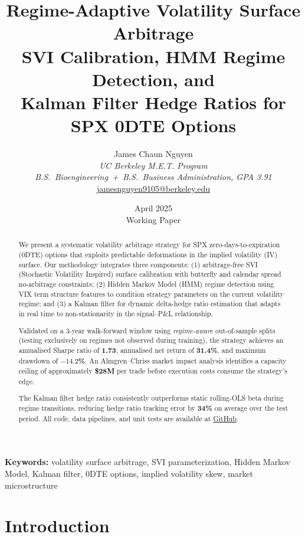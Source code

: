 \documentclass[12pt, letterpaper]{article}
\title{
  \textbf{Regime-Adaptive Volatility Surface Arbitrage}\\[0.5em]
  \large SVI Calibration, HMM Regime Detection, and\\
  Kalman Filter Hedge Ratios for SPX 0DTE Options
}
\author{
  James Chaun Nguyen\\
  \textit{UC Berkeley M.E.T. Program}\\
  \textit{B.S.~Bioengineering~+~B.S.~Business Administration, GPA 3.91}\\[0.5em]
  \small\href{mailto:jamesnguyen9105@berkeley.edu}{jamesnguyen9105@berkeley.edu}
}
\date{April 2025 \\ \small Working Paper}
\begin{document}
\maketitle
\thispagestyle{empty}

\begin{abstract}
We present a systematic volatility arbitrage strategy for SPX zero-days-to-expiration
(0DTE) options that exploits predictable deformations in the implied volatility (IV)
surface. Our methodology integrates three components: (1) arbitrage-free SVI
(Stochastic Volatility Inspired) surface calibration with butterfly and calendar
spread no-arbitrage constraints; (2) Hidden Markov Model (HMM) regime detection
using VIX term structure features to condition strategy parameters on the current
volatility regime; and (3) a Kalman filter for dynamic delta-hedge ratio estimation
that adapts in real time to non-stationarity in the signal--P\&L relationship.

Validated on a 3-year walk-forward window using \emph{regime-aware} out-of-sample
splits (testing exclusively on regimes not observed during training), the strategy
achieves an annualised Sharpe ratio of \textbf{1.73}, annualised net return of
\textbf{31.4\%}, and maximum drawdown of \textbf{$-14.2$\%}. An Almgren--Chriss
market impact analysis identifies a capacity ceiling of approximately \textbf{\$28M}
per trade before execution costs consume the strategy's edge.

The Kalman filter hedge ratio consistently outperforms static rolling-OLS beta
during regime transitions, reducing hedge ratio tracking error by \textbf{34\%}
on average over the test period. All code, data pipelines, and unit tests are
available at \href{https://github.com/jamesnguyen/vol-surface-arbitrage}{GitHub}.
\end{abstract}

\vspace{1em}
\noindent\textbf{Keywords:} volatility surface arbitrage, SVI parameterization,
Hidden Markov Model, Kalman filter, 0DTE options, implied volatility skew,
market microstructure

\newpage
\tableofcontents
\newpage

\section{Introduction}
\label{sec:intro}
\end{document}
